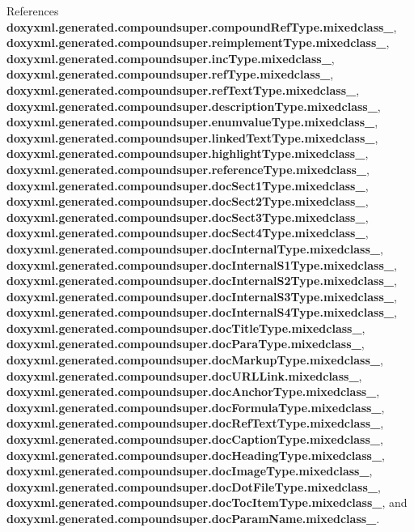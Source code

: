 References {\bf doxyxml.\+generated.\+compoundsuper.\+compound\+Ref\+Type.\+mixedclass\+\_\+}, {\bf doxyxml.\+generated.\+compoundsuper.\+reimplement\+Type.\+mixedclass\+\_\+}, {\bf doxyxml.\+generated.\+compoundsuper.\+inc\+Type.\+mixedclass\+\_\+}, {\bf doxyxml.\+generated.\+compoundsuper.\+ref\+Type.\+mixedclass\+\_\+}, {\bf doxyxml.\+generated.\+compoundsuper.\+ref\+Text\+Type.\+mixedclass\+\_\+}, {\bf doxyxml.\+generated.\+compoundsuper.\+description\+Type.\+mixedclass\+\_\+}, {\bf doxyxml.\+generated.\+compoundsuper.\+enumvalue\+Type.\+mixedclass\+\_\+}, {\bf doxyxml.\+generated.\+compoundsuper.\+linked\+Text\+Type.\+mixedclass\+\_\+}, {\bf doxyxml.\+generated.\+compoundsuper.\+highlight\+Type.\+mixedclass\+\_\+}, {\bf doxyxml.\+generated.\+compoundsuper.\+reference\+Type.\+mixedclass\+\_\+}, {\bf doxyxml.\+generated.\+compoundsuper.\+doc\+Sect1\+Type.\+mixedclass\+\_\+}, {\bf doxyxml.\+generated.\+compoundsuper.\+doc\+Sect2\+Type.\+mixedclass\+\_\+}, {\bf doxyxml.\+generated.\+compoundsuper.\+doc\+Sect3\+Type.\+mixedclass\+\_\+}, {\bf doxyxml.\+generated.\+compoundsuper.\+doc\+Sect4\+Type.\+mixedclass\+\_\+}, {\bf doxyxml.\+generated.\+compoundsuper.\+doc\+Internal\+Type.\+mixedclass\+\_\+}, {\bf doxyxml.\+generated.\+compoundsuper.\+doc\+Internal\+S1\+Type.\+mixedclass\+\_\+}, {\bf doxyxml.\+generated.\+compoundsuper.\+doc\+Internal\+S2\+Type.\+mixedclass\+\_\+}, {\bf doxyxml.\+generated.\+compoundsuper.\+doc\+Internal\+S3\+Type.\+mixedclass\+\_\+}, {\bf doxyxml.\+generated.\+compoundsuper.\+doc\+Internal\+S4\+Type.\+mixedclass\+\_\+}, {\bf doxyxml.\+generated.\+compoundsuper.\+doc\+Title\+Type.\+mixedclass\+\_\+}, {\bf doxyxml.\+generated.\+compoundsuper.\+doc\+Para\+Type.\+mixedclass\+\_\+}, {\bf doxyxml.\+generated.\+compoundsuper.\+doc\+Markup\+Type.\+mixedclass\+\_\+}, {\bf doxyxml.\+generated.\+compoundsuper.\+doc\+U\+R\+L\+Link.\+mixedclass\+\_\+}, {\bf doxyxml.\+generated.\+compoundsuper.\+doc\+Anchor\+Type.\+mixedclass\+\_\+}, {\bf doxyxml.\+generated.\+compoundsuper.\+doc\+Formula\+Type.\+mixedclass\+\_\+}, {\bf doxyxml.\+generated.\+compoundsuper.\+doc\+Ref\+Text\+Type.\+mixedclass\+\_\+}, {\bf doxyxml.\+generated.\+compoundsuper.\+doc\+Caption\+Type.\+mixedclass\+\_\+}, {\bf doxyxml.\+generated.\+compoundsuper.\+doc\+Heading\+Type.\+mixedclass\+\_\+}, {\bf doxyxml.\+generated.\+compoundsuper.\+doc\+Image\+Type.\+mixedclass\+\_\+}, {\bf doxyxml.\+generated.\+compoundsuper.\+doc\+Dot\+File\+Type.\+mixedclass\+\_\+}, {\bf doxyxml.\+generated.\+compoundsuper.\+doc\+Toc\+Item\+Type.\+mixedclass\+\_\+}, and {\bf doxyxml.\+generated.\+compoundsuper.\+doc\+Param\+Name.\+mixedclass\+\_\+}.



